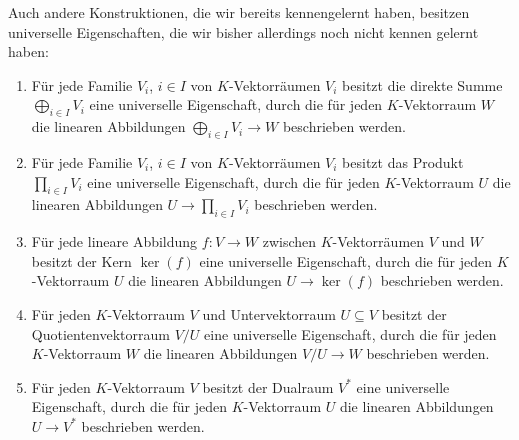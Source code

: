 \begin{remark}
  Auch andere Konstruktionen, die wir bereits kennengelernt haben, besitzen universelle Eigenschaften, die wir bisher allerdings noch nicht kennen gelernt haben:
  \begin{enumerate}
    \item
      Für jede Familie $V_i$, $i \in I$ von $K$-Vektorräumen $V_i$ besitzt die direkte Summe $\bigoplus_{i \in I} V_i$ eine universelle Eigenschaft, durch die für jeden $K$-Vektorraum $W$ die linearen Abbildungen $\bigoplus_{i \in I} V_i \to W$ beschrieben werden.
    \item
      Für jede Familie $V_i$, $i \in I$ von $K$-Vektorräumen $V_i$ besitzt das Produkt $\prod_{i \in I} V_i$ eine universelle Eigenschaft, durch die für jeden $K$-Vektorraum $U$ die linearen Abbildungen $U \to \prod_{i \in I} V_i$ beschrieben werden.
    \item
      Für jede lineare Abbildung $f \colon V \to W$ zwischen $K$-Vektorräumen $V$ und $W$ besitzt der Kern $\ker(f)$ eine universelle Eigenschaft, durch die für jeden $K$-Vektorraum $U$ die linearen Abbildungen $U \to \ker(f)$ beschrieben werden.
    \item
      Für jeden $K$-Vektorraum $V$ und Untervektorraum $U \subseteq V$ besitzt der Quotientenvektorraum $V\!/U$ eine universelle Eigenschaft, durch die für jeden $K$-Vektorraum $W$ die linearen Abbildungen $V\!/U \to W$ beschrieben werden.
    \item
      Für jeden $K$-Vektorraum $V$ besitzt der Dualraum $V^*$ eine universelle Eigenschaft, durch die für jeden $K$-Vektorraum $U$ die linearen Abbildungen $U \to V^*$ beschrieben werden.
  \end{enumerate}
\end{remark}


